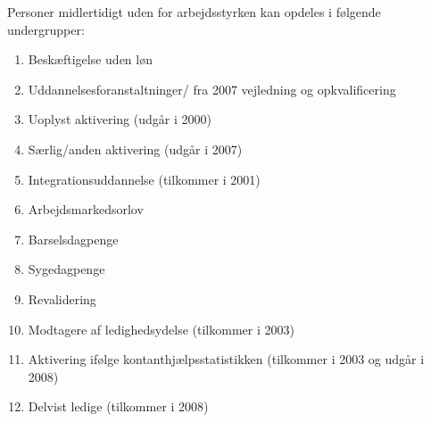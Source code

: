 {Personer midlertidigt uden for arbejdsstyrken kan opdeles i følgende undergrupper:
\begin{enumerate} [topsep=6pt,itemsep=-1ex]
  \item Beskæftigelse uden løn
  \item Uddannelsesforanstaltninger/ fra 2007 vejledning og opkvalificering
  \item Uoplyst aktivering (udgår i 2000)
  \item Særlig/anden aktivering (udgår i 2007)
  \item Integrationsuddannelse (tilkommer i 2001)
  \item Arbejdsmarkedsorlov
  \item Barselsdagpenge
  \item Sygedagpenge
  \item Revalidering
  \item Modtagere af ledighedsydelse (tilkommer i 2003)
  \item Aktivering ifølge kontanthjælpsstatistikken (tilkommer i 2003 og udgår i 2008)
  \item Delvist ledige (tilkommer i 2008)
\end{enumerate}

}
